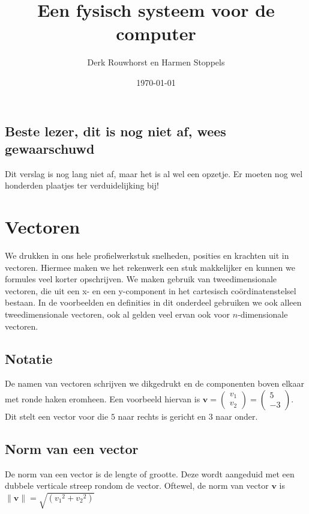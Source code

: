 \documentclass[12pt,a4paper]{article}
\title{Een fysisch systeem voor de computer}
\date{\today}
\author{Derk Rouwhorst en Harmen Stoppels}
\begin{document}
	\begin{titlepage}
	\maketitle
	\end{titlepage}
	\subsection*{Beste lezer, dit is nog niet af, wees gewaarschuwd}
	Dit verslag is nog lang niet af, maar het is al wel een opzetje. Er moeten nog wel honderden plaatjes ter verduidelijking bij!
	\newpage
	
	\tableofcontents
	\newpage
	
	\section{Vectoren}
	We drukken in ons hele profielwerkstuk snelheden, posities en krachten uit in vectoren. Hiermee maken we het rekenwerk een stuk makkelijker en kunnen we formules veel korter opschrijven. We maken gebruik van tweedimensionale vectoren, die uit een x- en een y-component in het cartesisch co\"{o}rdinatenstelsel bestaan. In de voorbeelden en definities in dit onderdeel gebruiken we ook alleen tweedimensionale vectoren, ook al gelden veel ervan ook voor $n$-dimensionale vectoren.
	
	\subsection{Notatie}
	De namen van vectoren schrijven we dikgedrukt en de componenten boven elkaar met ronde haken eromheen. Een voorbeeld hiervan is $\mathbf{v} = \begin{pmatrix} v_1 \\ v_2 \end{pmatrix} = \begin{pmatrix} 5 \\ -3 \end{pmatrix}$. Dit stelt een vector voor die $5$ naar rechts is gericht en $3$ naar onder.
	
	\subsection{Norm van een vector}
	De norm van een vector is de lengte of grootte. Deze wordt aangeduid met een dubbele verticale streep rondom de vector. Oftewel, de norm van vector $\mathbf{v}$ is $\|\mathbf{v}\| = \sqrt{\left({v_1}^2+{v_2}^2\right)}$
	
\end{document}
